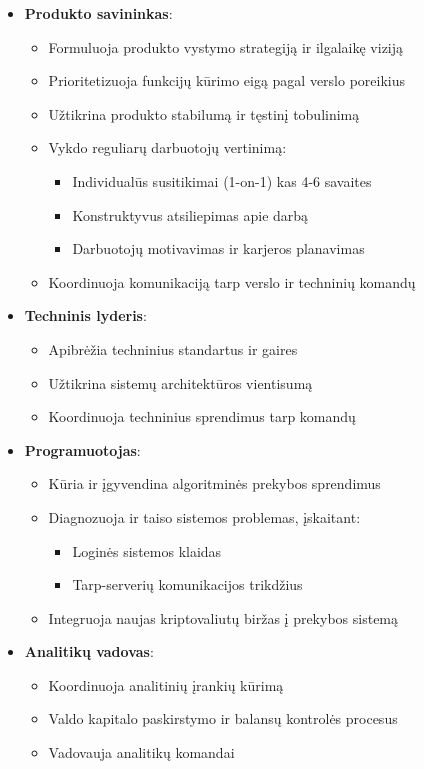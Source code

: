 \documentclass[]{VUMIFTemplateClass}
\begin{document}
\begin{itemize}
\item \textbf{Produkto savininkas}:
\begin{itemize}
\item Formuluoja produkto vystymo strategiją ir ilgalaikę viziją
\item Prioritetizuoja funkcijų kūrimo eigą pagal verslo poreikius
\item Užtikrina produkto stabilumą ir tęstinį tobulinimą
\item Vykdo reguliarų darbuotojų vertinimą:
\begin{itemize}
\item Individualūs susitikimai (1-on-1) kas 4-6 savaites
\item Konstruktyvus atsiliepimas apie darbą
\item Darbuotojų motivavimas ir karjeros planavimas
\end{itemize}
\item Koordinuoja komunikaciją tarp verslo ir techninių komandų
\end{itemize}

\item \textbf{Techninis lyderis}:
\begin{itemize}
\item Apibrėžia techninius standartus ir gaires
\item Užtikrina sistemų architektūros vientisumą
\item Koordinuoja techninius sprendimus tarp komandų
\end{itemize}

\item \textbf{Programuotojas}:
\begin{itemize}
\item Kūria ir įgyvendina algoritminės prekybos sprendimus
\item Diagnozuoja ir taiso sistemos problemas, įskaitant:
\begin{itemize}
\item Loginės sistemos klaidas
\item Tarp-serverių komunikacijos trikdžius
\end{itemize}
\item Integruoja naujas kriptovaliutų biržas į prekybos sistemą
\end{itemize}

\item \textbf{Analitikų vadovas}:
\begin{itemize}
\item Koordinuoja analitinių įrankių kūrimą
\item Valdo kapitalo paskirstymo ir balansų kontrolės procesus
\item Vadovauja analitikų komandai
\end{itemize}


\end{itemize}
\end{document}
